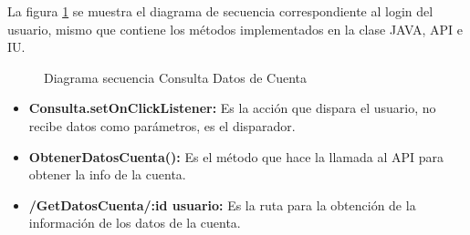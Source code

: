 La figura \ref{fig:SecuenciaInfoCuenta} se muestra el diagrama de secuencia correspondiente al login del usuario, mismo que contiene los métodos implementados en la clase JAVA, API e IU.

\begin{figure}[htbp!]
	\centering
	\caption{Diagrama secuencia Consulta Datos de Cuenta}
	\label{fig:SecuenciaInfoCuenta}
\end{figure}

\begin{itemize}
	\item \textbf{Consulta.setOnClickListener:} Es la acción que dispara el usuario, no recibe datos como parámetros, es el disparador.
	\item \textbf{ObtenerDatosCuenta():} Es el método que hace la llamada al API para obtener la info de la cuenta.
	\item \textbf{/GetDatosCuenta/:id usuario:} Es la ruta para la obtención de la información de los datos de la cuenta.
\end{itemize}







